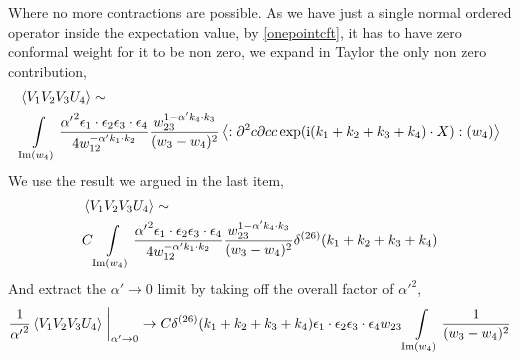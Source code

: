 Where no more contractions are possible. As we have just a single normal ordered operator inside the expectation value, by \cref{onepointcft}, it has to have zero 
conformal weight for it to be non zero, we expand in Taylor the only non zero contribution,
\begin{align*}
    &\expval{V_1V_2V_3U_4}\sim\\
    &\int\limits_{\textnormal{Im}(w_4)}\frac{{\alpha'}^2\epsilon_1\cdot\epsilon_2\epsilon_{3}\cdot\epsilon_{4}}{4w_{12}^{-\alpha'k_1\cdot k_2}}\frac{w_{23}^{1-\alpha' k_4\cdot k_3}}{(w_3-w_4)^2}\expval{:{\partial^2c\partial cc\exp(\textnormal{i}(k_1+k_2+ k_3+k_4)\cdot X)}:(w_4)}
\end{align*}
We use the result we argued in the last item,
\begin{align*}
    &\expval{V_1V_2V_3U_4}\sim\\
    &C\int\limits_{\textnormal{Im}(w_4)}\frac{{\alpha'}^2\epsilon_1\cdot\epsilon_2\epsilon_{3}\cdot\epsilon_{4}}{4w_{12}^{-\alpha'k_1\cdot k_2}}\frac{w_{23}^{1-\alpha' k_4\cdot k_3}}{(w_3-w_4)^2}\delta^{(26)}\qty(k_1+k_2+k_3+k_4)
\end{align*}
And extract the $\alpha'\rightarrow0$ limit by taking off the overall factor of ${\alpha'}^2$,
\begin{align*}
    \frac{1}{{\alpha'}^2}\expval{V_1V_2V_3U_4}\eval_{\alpha'\rightarrow0}\rightarrow C\delta^{(26)}\qty(k_1+k_2+k_3+k_4)\epsilon_1\cdot\epsilon_2\epsilon_{3}\cdot\epsilon_{4}w_{23}\int\limits_{\textnormal{Im}(w_4)}\frac{1}{(w_3-w_4)^2}
\end{align*}